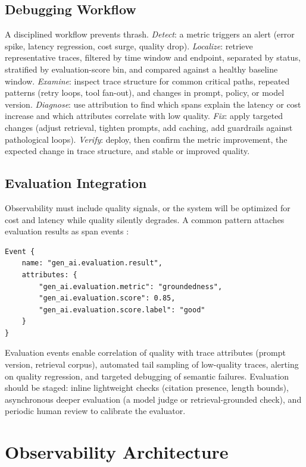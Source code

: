 \documentclass[11pt]{book}
\begin{document}
\subsection{Debugging Workflow}

A disciplined workflow prevents thrash. \textit{Detect}: a metric triggers an alert (error spike, latency regression, cost surge, quality drop). \textit{Localize}: retrieve representative traces, filtered by time window and endpoint, separated by status, stratified by evaluation-score bin, and compared against a healthy baseline window. \textit{Examine}: inspect trace structure for common critical paths, repeated patterns (retry loops, tool fan-out), and changes in prompt, policy, or model version. \textit{Diagnose}: use attribution to find which spans explain the latency or cost increase and which attributes correlate with low quality. \textit{Fix}: apply targeted changes (adjust retrieval, tighten prompts, add caching, add guardrails against pathological loops). \textit{Verify}: deploy, then confirm the metric improvement, the expected change in trace structure, and stable or improved quality.

\subsection{Evaluation Integration}

Observability must include quality signals, or the system will be optimized for cost and latency while quality silently degrades. A common pattern attaches evaluation results as span events \cite{otelgenai2025}:
\begin{verbatim}
Event {
    name: "gen_ai.evaluation.result",
    attributes: {
        "gen_ai.evaluation.metric": "groundedness",
        "gen_ai.evaluation.score": 0.85,
        "gen_ai.evaluation.score.label": "good"
    }
}
\end{verbatim}
Evaluation events enable correlation of quality with trace attributes (prompt version, retrieval corpus), automated tail sampling of low-quality traces, alerting on quality regression, and targeted debugging of semantic failures. Evaluation should be staged: inline lightweight checks (citation presence, length bounds), asynchronous deeper evaluation (a model judge or retrieval-grounded check), and periodic human review to calibrate the evaluator.

\section{Observability Architecture}
\end{document}
